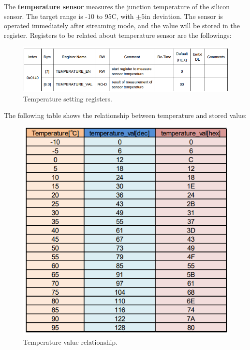 \documentclass[10pt]{article}
\begin{document}
\begin{multicols}{2}
The \textbf{temperature sensor} measures the junction temperature of the silicon sensor. The target range is -10 to 95\textdegree C, with $\pm5$\textdegree in deviation. The sensor is operated immediately after streaming mode, and the value will be stored in the register.
\newline
Registers to be related about temperature sensor are the followings:
\begin{figure}[H]
    \centering
    \includegraphics[width=1\linewidth]{Images/Week 2/temp-register.png}
    \caption{Temperature setting registers.}
\end{figure}
The following table shows the relationship between temperature and stored value:
\begin{figure}[H]
    \centering
    \includegraphics[width=1\linewidth]{Images/Week 2/temp-table.png}
    \caption{Temperature value relationship.}
\end{figure}




\end{multicols}
\end{document}
